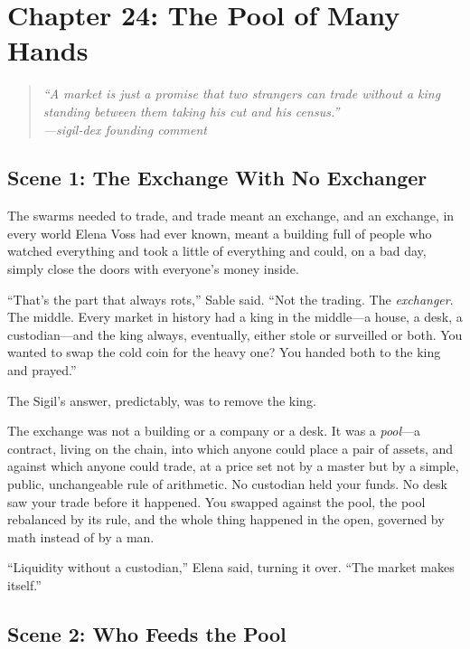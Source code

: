 \hypertarget{chapter-24-the-pool-of-many-hands}{%
\section{Chapter 24: The Pool of Many
Hands}\label{chapter-24-the-pool-of-many-hands}}

\begin{quote}
\itshape ``A market is just a promise that two strangers can trade without a king
standing between them taking his cut and his census.''\\
\normalfont\hfill---sigil-dex founding comment
\end{quote}

\hypertarget{scene-1-the-exchange-with-no-exchanger}{%
\subsection{Scene 1: The Exchange With No
Exchanger}\label{scene-1-the-exchange-with-no-exchanger}}

The swarms needed to trade, and trade meant an exchange, and an exchange, in every
world Elena Voss had ever known, meant a building full of people who watched
everything and took a little of everything and could, on a bad day, simply close
the doors with everyone's money inside.

``That's the part that always rots,'' Sable said. ``Not the trading. The
\emph{exchanger}. The middle. Every market in history had a king in the middle---a
house, a desk, a custodian---and the king always, eventually, either stole or
surveilled or both. You wanted to swap the cold coin for the heavy one? You handed
both to the king and prayed.''

The Sigil's answer, predictably, was to remove the king.

The exchange was not a building or a company or a desk. It was a \emph{pool}---a
contract, living on the chain, into which anyone could place a pair of assets, and
against which anyone could trade, at a price set not by a master but by a simple,
public, unchangeable rule of arithmetic. No custodian held your funds. No desk saw
your trade before it happened. You swapped against the pool, the pool rebalanced by
its rule, and the whole thing happened in the open, governed by math instead of by a
man.

``Liquidity without a custodian,'' Elena said, turning it over. ``The market makes
itself.''

\hypertarget{scene-2-who-feeds-the-pool}{%
\subsection{Scene 2: Who Feeds the
Pool}\label{scene-2-who-feeds-the-pool}}


